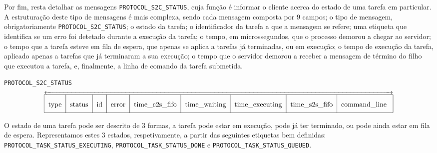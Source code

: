 \documentclass[11pt]{article}
\begin{document}
Por fim, resta detalhar as mensagens \texttt{PROTOCOL\_S2C\_STATUS}, cuja função é informar o
cliente acerca do estado de uma tarefa em particular. A estruturação deste tipo de mensagens é mais
complexa, sendo cada mensagem composta por 9 campos; o tipo de mensagem, obrigatoriamente
\texttt{PROTOCOL\_S2C\_STATUS}; o estado da tarefa; o identificador da tarefa a que a mensagem se
refere; uma etiqueta que identifica se um erro foi detetado durante a execução da tarefa; o tempo,
em microssegundos, que o processo demorou a chegar ao servidor; o tempo que a tarefa esteve em fila
de espera, que apenas se aplica a tarefas já terminadas, ou em execução; o tempo de execução da
tarefa, aplicado apenas a tarefas que já terminaram a sua execução; o tempo que o servidor demorou a
receber a mensagem de término do filho que executou a tarefa, e, finalmente, a linha de comando da
tarefa submetida. \\

\begin{adjustwidth}{-1in}{-1in}
\begin{center}
    \abovedisplayskip=-1pt
    \texttt{PROTOCOL\_S2C\_STATUS}
    $$\overleftrightarrow{
        \begin{tabular}{|c|c|c|c|c|c|c|c|c|}
            \hline
                type &
                status &
                id &
                error &
                time\_c2s\_fifo &
                time\_waiting &
                time\_executing &
                time\_s2s\_fifo &
                command\_line
                \rule[-2ex]{0pt}{6ex}\\
            \hline
        \end{tabular}
    }$$
\end{center}
\end{adjustwidth}

O estado de uma tarefa pode ser descrito de 3 formas, a tarefa pode estar em execução, pode já ter
terminado, ou pode ainda estar em fila de espera. Representamos estes 3 estados, respetivamente, a
partir das seguintes etiquetas bem definidas: \texttt{PROTOCOL\_TASK\_STATUS\_EXECUTING},
\texttt{PROTOCOL\_TASK\_STATUS\_DONE} e \texttt{PROTOCOL\_TASK\_STATUS\_QUEUED}.
\end{document}

